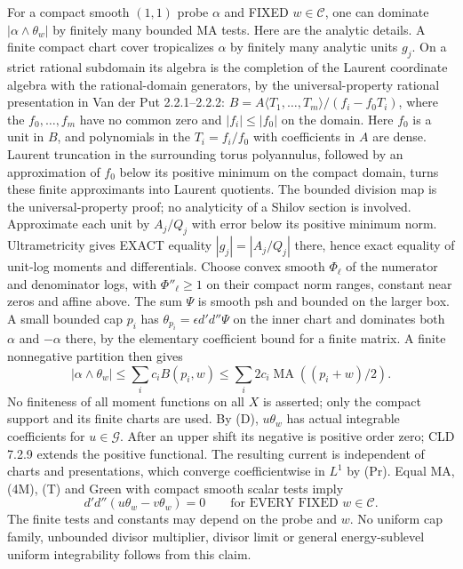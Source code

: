 \documentclass[11pt]{article}
\newcommand{\DD}{d'd''}
\newcommand{\MA}{\operatorname{MA}}
\newcommand{\C}{\mathcal C}
\newcommand{\G}{\mathcal G}
\theoremstyle{remark}\newtheorem{remark}[theorem]{Remark}
\begin{document}
For a compact smooth $(1,1)$ probe $\alpha$ and FIXED $w\in\C$,
one can dominate $|\alpha\wedge\theta_w|$ by finitely many bounded
MA tests. Here are the analytic details. A finite compact chart cover
tropicalizes $\alpha$ by finitely many analytic units $g_j$.
On a strict rational subdomain its algebra is the completion of the
Laurent coordinate algebra with the rational-domain generators, by the
universal-property rational presentation in Van der Put 2.2.1--2.2.2:
$B=A\langle T_1,\ldots,T_m\rangle/(f_i-f_0T_i)$, where the
$f_0,\ldots,f_m$ have no common zero and $|f_i|\le|f_0|$ on
the domain. Here $f_0$ is a unit in $B$, and polynomials in the
$T_i=f_i/f_0$ with coefficients in $A$ are dense. Laurent truncation
in the surrounding torus polyannulus, followed by an approximation of
$f_0$ below its positive minimum on the compact domain, turns these
finite approximants into Laurent quotients. The bounded division map
is the universal-property proof; no analyticity of a Shilov section is
involved.
Approximate each unit by $A_j/Q_j$ with error below its positive
minimum norm. Ultrametricity gives EXACT equality
$|g_j|=|A_j/Q_j|$ there, hence exact equality of unit-log moments and
differentials. Choose convex smooth $\Phi_\ell$ of the numerator and
denominator logs, with $\Phi''_\ell\ge1$ on their compact norm ranges,
constant near zeros and affine above. The sum $\Psi$ is smooth psh
and bounded on the larger box. A small bounded cap $p_i$ has
$\theta_{p_i}=\epsilon\DD\Psi$ on the inner chart and dominates
both $\alpha$ and $-\alpha$ there, by the elementary coefficient
bound for a finite matrix. A finite nonnegative partition then gives
\[
|\alpha\wedge\theta_w|\le\sum_i c_i B(p_i,w)
\le\sum_i2c_i\MA((p_i+w)/2).
\tag{Pr}
\]
No finiteness of all moment functions on all $X$ is asserted; only the
compact support and its finite charts are used.
By (D), $u\theta_w$ has actual integrable coefficients for $u\in\G$.
After an upper shift its negative is positive order zero; CLD 7.2.9
extends the positive functional. The resulting current is independent
of charts and presentations, which converge coefficientwise in $L^1$
by (Pr). Equal MA, (4M), (T) and Green with compact smooth scalar
tests imply
\[
\DD(u\theta_w-v\theta_w)=0\qquad\text{for EVERY FIXED }w\in\C.
\]
The finite tests and constants may depend on the probe and $w$.
No uniform cap family, unbounded divisor multiplier, divisor limit or
general energy-sublevel uniform integrability follows from this claim.
\end{document}
